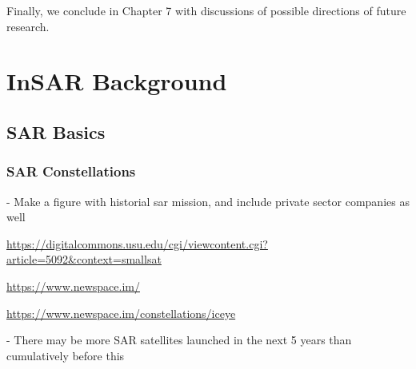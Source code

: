 \documentclass{utexasthesis}
\begin{document}
Finally, we conclude in Chapter 7 with discussions of possible directions of future research.







%
%
%
%
%
%
%
%




\chapter{InSAR Background}



\section{SAR Basics}

\subsection{SAR Constellations}

- Make a figure with historial sar mission, and include private sector companies as well

\url{https://digitalcommons.usu.edu/cgi/viewcontent.cgi?article=5092&context=smallsat}

\url{https://www.newspace.im/ }

\url{https://www.newspace.im/constellations/iceye}


- There may be more SAR satellites launched in the next 5 years than cumulatively before this
\end{document}
